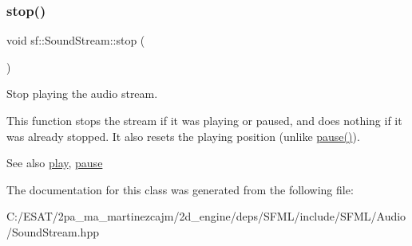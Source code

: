 \subsubsection{\texorpdfstring{stop()}{stop()}}
{\footnotesize\ttfamily void sf\+::\+Sound\+Stream\+::stop (\begin{DoxyParamCaption}{ }\end{DoxyParamCaption})}



Stop playing the audio stream. 

This function stops the stream if it was playing or paused, and does nothing if it was already stopped. It also resets the playing position (unlike \hyperlink{classsf_1_1_sound_stream_a932ff181e661503cad288b4bb6fe45ca}{pause()}).

\begin{DoxySeeAlso}{See also}
\hyperlink{classsf_1_1_sound_stream_afdc08b69cab5f243d9324940a85a1144}{play}, \hyperlink{classsf_1_1_sound_stream_a932ff181e661503cad288b4bb6fe45ca}{pause} 
\end{DoxySeeAlso}


The documentation for this class was generated from the following file\+:\begin{DoxyCompactItemize}
\item 
C\+:/\+E\+S\+A\+T/2pa\+\_\+ma\+\_\+martinezcajm/2d\+\_\+engine/deps/\+S\+F\+M\+L/include/\+S\+F\+M\+L/\+Audio/Sound\+Stream.\+hpp\end{DoxyCompactItemize}
